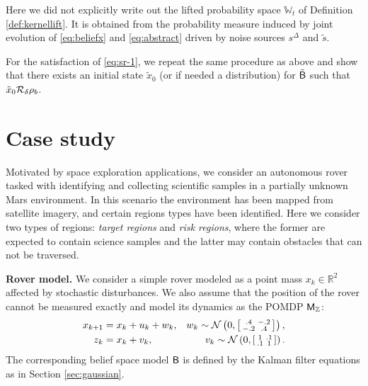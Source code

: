 \documentclass{ifacconf}
\begin{document}
 
\begin{remark}
  Here we did not explicitly write out the lifted probability space $\mathbb{W}_t$ of Definition \ref{def:kernellift}. It is obtained from the probability measure induced by joint evolution of \eqref{eq:beliefx} and \eqref{eq:abstract} driven by noise sources $s^\Delta$ and $ {\tilde{s}} $.  
 \end{remark}


For the satisfaction of \eqref{eq:sr-1}, we repeat the same procedure as above and show that there exists an initial state $\tilde x_{0}$ (or if needed a distribution) for $\tilde {\mathsf{B}}$ such that  $\tilde x_{0} \relax\mathcal{R}_\delta \rho_b$.


\section{Case study}
\label{sec:case}

Motivated by space exploration applications, we consider an autonomous rover tasked with identifying and collecting scientific samples in a partially unknown Mars environment. In this scenario the environment has been mapped from satellite imagery, and certain regions types have been identified. Here we consider two types of regions: \emph{target regions} and \emph{risk regions}, where the former are expected to contain science samples and the latter may contain obstacles that can not be traversed. 

\textbf{Rover model.} We consider a simple rover modeled as a point mass $x_k \in \mathbb{R}^2$ affected by stochastic disturbances. We also assume that the position of the rover cannot be measured exactly and model its dynamics as the POMDP $\mathsf{M}_{{\mathbb{Z}}}$:
\begin{equation*}
\begin{aligned}
  x_{k+1}&= x_{k} + u_k+ w_k,  & w_k \sim \mathcal{N} \left(0,\begin{bsmallmatrix}.4&-.2\\-.2&.4\end{bsmallmatrix}\right), \\
  z_k&= x_k+v_k, &  v_k \sim \mathcal{N} \left(0,\begin{bsmallmatrix}1&.1\\.1&1\end{bsmallmatrix}\right).
\end{aligned}
\end{equation*}
The corresponding belief space model $\mathsf{B}$ is defined by the Kalman filter equations as in Section \ref{sec:gaussian}. 
\end{document}
